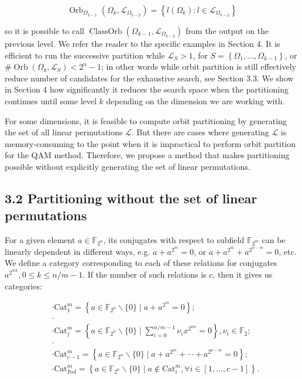 \documentclass[10pt]{article}
\begin{document}
$$
\operatorname{Orb}_{\Omega_{k-1}}\left(\Omega_{k}, \mathcal{L}_{\Omega_{k-2}}\right)=\left\{l\left(\Omega_{k}\right): l \in \mathcal{L}_{\Omega_{k-2}}\right\}
$$

so it is possible to call $\operatorname{ClassOrb}\left(\Omega_{k-1}, \mathcal{L}_{\Omega_{k-2}}\right)$ from the output on the previous level. We refer the reader to the specific examples in Section 4. It is efficient to run the successive partition while $\mathcal{L}_{S}>1$, for $S=\left\{\Omega_{1}, \ldots, \Omega_{k-1}\right\}$, or $\# \operatorname{Orb}\left(\Omega_{k}, \mathcal{L}_{S}\right)<2^{n}-1$; in other words while orbit partition is still effectively reduce number of candidates for the exhaustive search, see Section 3.3. We show in Section 4 how significantly it reduces the search space when the partitioning continues until some level $k$ depending on the dimension we are working with.

For some dimensions, it is feasible to compute orbit partitioning by generating the set of all linear permutations $\mathcal{L}$. But there are cases where generating $\mathcal{L}$ is memory-consuming to the point when it is impractical to perform orbit partition for the QAM method. Therefore, we propose a method that makes partitioning possible without explicitly generating the set of linear permutations.

\subsection*{3.2 Partitioning without the set of linear permutations}
For a given element $a \in \mathbb{F}_{2^{n}}$, its conjugates with respect to subfield $\mathbb{F}_{2^{m}}$ can be linearly dependent in different ways, e.g. $a+a^{2^{m}}=0$, or $a+a^{2^{m}}+a^{2^{n-m}}=0$, etc. We define a category corresponding to each of these relations for conjugates $a^{2^{m k}}, 0 \leq k \leq n / m-1$. If the number of such relations is $c$, then it gives us categories:

$$
\begin{aligned}
& \cdot \mathrm{Cat}_{1}^{m}=\left\{a \in \mathbb{F}_{2^{n}} \backslash\{0\} \mid a+a^{2^{m}}=0\right\} ; \\
& \cdot \\
& \cdot \mathrm{Cat}_{j}^{m}=\left\{a \in \mathbb{F}_{2^{n}} \backslash\{0\} \mid \sum_{i=0}^{n / m-1} \nu_{i} x^{2^{m i}}=0\right\}, \nu_{i} \in \mathbb{F}_{2} ; \\
& \cdot \\
& \cdot \mathrm{Cat}_{c-1}^{m}=\left\{a \in \mathbb{F}_{2^{n}} \backslash\{0\} \mid a+a^{2^{m}}+\cdots+a^{2^{n-m}}=0\right\} ; \\
& \cdot \mathrm{Cat}_{I n d}^{m}=\left\{a \in \mathbb{F}_{2^{n}} \backslash\{0\} \mid a \notin \mathrm{Cat}_{i}^{m}, \forall i \in[1, \ldots, c-1]\right\} .
\end{aligned}
$$
\end{document}
